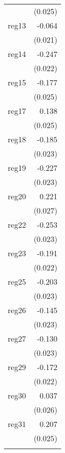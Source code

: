 {\begin{longtable}{l*{1}{D{.}{.}{-1}}}
            &     (0.025)         \\
\addlinespace
reg13       &      -0.064\sym{**} \\
            &     (0.021)         \\
\addlinespace
reg14       &      -0.247\sym{***}\\
            &     (0.022)         \\
\addlinespace
reg15       &      -0.177\sym{***}\\
            &     (0.025)         \\
\addlinespace
reg17       &       0.138\sym{***}\\
            &     (0.025)         \\
\addlinespace
reg18       &      -0.185\sym{***}\\
            &     (0.023)         \\
\addlinespace
reg19       &      -0.227\sym{***}\\
            &     (0.023)         \\
\addlinespace
reg20       &       0.221\sym{***}\\
            &     (0.027)         \\
\addlinespace
reg22       &      -0.253\sym{***}\\
            &     (0.023)         \\
\addlinespace
reg23       &      -0.191\sym{***}\\
            &     (0.022)         \\
\addlinespace
reg25       &      -0.203\sym{***}\\
            &     (0.023)         \\
\addlinespace
reg26       &      -0.145\sym{***}\\
            &     (0.023)         \\
\addlinespace
reg27       &      -0.130\sym{***}\\
            &     (0.023)         \\
\addlinespace
reg29       &      -0.172\sym{***}\\
            &     (0.022)         \\
\addlinespace
reg30       &       0.037         \\
            &     (0.026)         \\
\addlinespace
reg31       &       0.207\sym{***}\\
            &     (0.025)         \\
\addlinespace

\end{longtable}}
